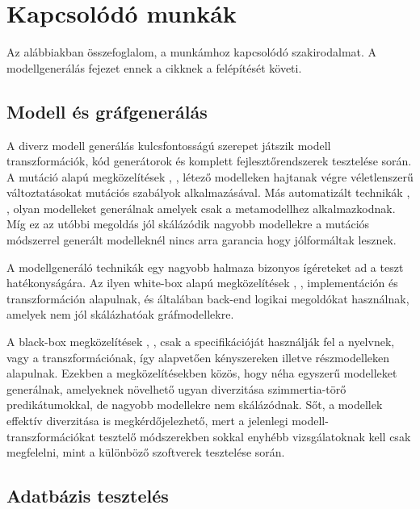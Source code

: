\chapter{Kapcsolódó munkák}

Az alábbiakban összefoglalom, a munkámhoz kapcsolódó szakirodalmat. A modellgenerálás fejezet ennek \cite{semerath2018iterative} a cikknek a felépítését követi.  

\section{Modell és gráfgenerálás}

A diverz modell generálás kulcsfontosságú szerepet játszik modell transzformációk, kód generátorok és komplett fejlesztőrendszerek tesztelése során. A mutáció alapú megközelítések \cite{aranega2015towards}, \cite{darabos2008towards},  létező modelleken hajtanak végre véletlenszerű változtatásokat mutációs szabályok alkalmazásával. Más automatizált technikák  \cite{brottier2006metamodel}, \cite{ehrig2009generating}, olyan modelleket generálnak amelyek csak a metamodellhez alkalmazkodnak. Míg ez  az utóbbi megoldás jól skálázódik nagyobb modellekre a mutációs módszerrel generált  modelleknél nincs arra  garancia hogy jólformáltak lesznek.

A modellgeneráló technikák egy nagyobb halmaza bizonyos ígéreteket ad a teszt hatékonyságára. Az ilyen white-box alapú megközelítések \cite{aranega2015towards}, \cite{bordbar2005uml2alloy}, implementáción és transzformáción alapulnak, és általában back-end logikai megoldókat használnak, amelyek nem jól skálázhatóak gráfmodellekre.

A black-box megközelítések \cite{buttner2012verification}, \cite{fleurey2007towards}, csak a specifikációját használják fel a nyelvnek, vagy a transzformációnak, így alapvetően  kényszereken illetve részmodelleken alapulnak. Ezekben a megközelítésekben közös, hogy néha egyszerű modelleket generálnak, amelyeknek   növelhető ugyan diverzitása szimmertia-törő predikátumokkal, de nagyobb modellekre nem skálázódnak. Sőt,  a modellek effektív diverzitása is megkérdőjelezhető, mert a jelenlegi modell- transzformációkat tesztelő módszerekben sokkal enyhébb vizsgálatoknak kell csak megfelelni, mint a különböző szoftverek tesztelése során.

\section{Adatbázis tesztelés}

